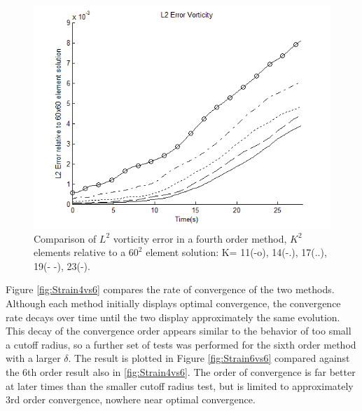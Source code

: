 \documentclass[letterpaper,12pt]{report}
\begin{document}
\begin{figure}
\centering
\includegraphics[width=1\textwidth]{StrainL2.PNG}
\caption{\label{fig:StrainL2}Comparison of $L^2$ vorticity error in a fourth order method, $K^2$ elements relative to a $60^2$ element solution: K= 11(-o), 14(-.), 17(..), 19(- -), 23(-). }
\end{figure}

Figure \ref{fig:Strain4vs6} compares the rate of convergence of the two methods. Although each method initially displays optimal convergence, the convergence rate decays over time until the two display approximately the same evolution. This decay of the convergence order appears similar to the behavior of too small a cutoff radius, so a further set of tests was performed for the sixth order method with a larger $\delta$. The result is plotted in Figure \ref{fig:Strain6vs6} compared against the 6th order result also in \ref{fig:Strain4vs6}. The order of convergence is far better at later times than the smaller cutoff radius test, but is limited to approximately 3rd order convergence, nowhere near optimal convergence.
\end{document}
